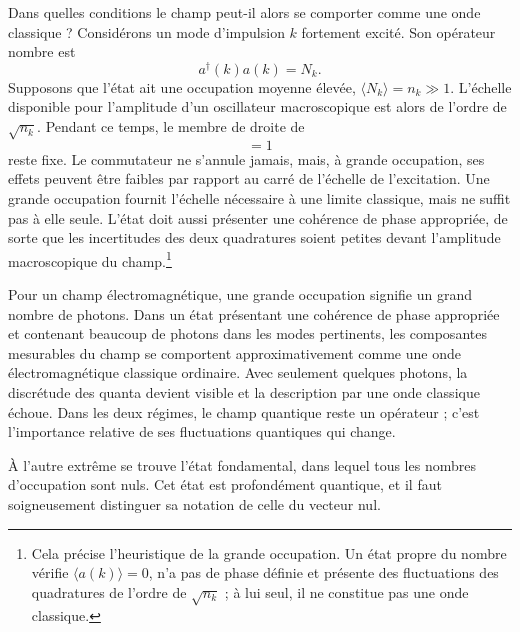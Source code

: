 Dans quelles conditions le champ peut-il alors se comporter comme une onde classique ? Considérons un mode d’impulsion \(k\) fortement excité. Son opérateur nombre est
\begin{equation}
a^\dagger(k)a(k)=N_k.
\end{equation}
Supposons que l’état ait une occupation moyenne élevée, \(\langle N_k\rangle=n_k\gg 1\). L’échelle disponible pour l’amplitude d’un oscillateur macroscopique est alors de l’ordre de \(\sqrt{n_k}\). Pendant ce temps, le membre de droite de
\begin{equation}
[a(k),a^\dagger(k)]=1
\end{equation}
reste fixe. Le commutateur ne s’annule jamais, mais, à grande occupation, ses effets peuvent être faibles par rapport au carré de l’échelle de l’excitation. Une grande occupation fournit l’échelle nécessaire à une limite classique, mais ne suffit pas à elle seule. L’état doit aussi présenter une cohérence de phase appropriée, de sorte que les incertitudes des deux quadratures soient petites devant l’amplitude macroscopique du champ.\footnote{Cela précise l’heuristique de la grande occupation. Un état propre du nombre vérifie \(\langle a(k)\rangle=0\), n’a pas de phase définie et présente des fluctuations des quadratures de l’ordre de \(\sqrt{n_k}\) ; à lui seul, il ne constitue pas une onde classique.}

Pour un champ électromagnétique, une grande occupation signifie un grand nombre de photons. Dans un état présentant une cohérence de phase appropriée et contenant beaucoup de photons dans les modes pertinents, les composantes mesurables du champ se comportent approximativement comme une onde électromagnétique classique ordinaire. Avec seulement quelques photons, la discrétude des quanta devient visible et la description par une onde classique échoue. Dans les deux régimes, le champ quantique reste un opérateur ; c’est l’importance relative de ses fluctuations quantiques qui change.

\begin{classroomqa}\end{classroomqa}

À l’autre extrême se trouve l’état fondamental, dans lequel tous les nombres d’occupation sont nuls. Cet état est profondément quantique, et il faut soigneusement distinguer sa notation de celle du vecteur nul.

